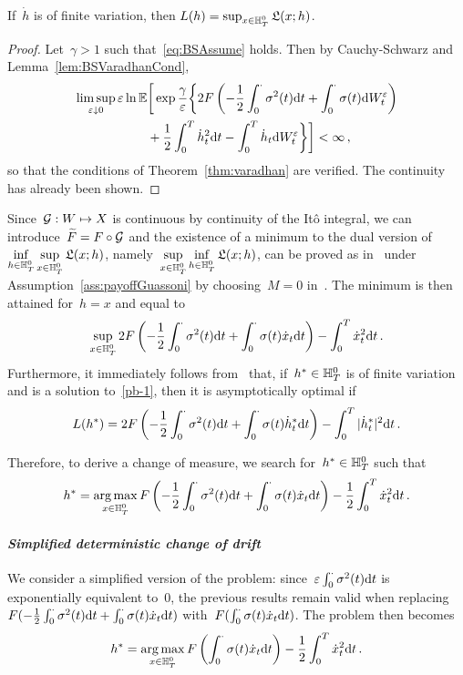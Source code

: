 \begin{lemma}
If~$\dot{h}$ is of finite variation, then 
$L(h) = \sup_{x \in \mathbb{H}_T^0}\mathfrak{L}(x;h)$.
\end{lemma}
\begin{proof}
Let~$\gamma>1$ such that~\eqref{eq:BSAssume} holds. Then by Cauchy-Schwarz and Lemma~\ref{lem:BSVaradhanCond},
\begin{align*}
\limsup\limits_{\varepsilon\downarrow 0} \varepsilon \ln\mathbb{E}&\bigg[\exp\frac{\gamma}{\varepsilon}\bigg\{2F\left(-\frac{1}{2}\int_0^\cdot \sigma^2(t)\mathrm{d} t + \int_0^\cdot \sigma(t) \mathrm{d} W_t^\varepsilon\right) \\
&+ \frac{1}{2}\int_0^T \dot{h}_t^2\mathrm{d} t - \int_0^T \dot{h}_t \mathrm{d} W_t^{\varepsilon} \bigg\}\bigg] <\infty\,,
\end{align*}
so that the conditions of Theorem~\ref{thm:varadhan} are verified.
The continuity has already been shown.
\end{proof}
Since~$\mathcal{G}: W\mapsto X$ is continuous by continuity of the It\^{o} integral, we can introduce~$\widetilde F =\nobreak F\circ\mathcal{G}$ and the existence of a minimum to the dual version of 
$\inf\limits_{h \in \mathbb{H}_T^0} \sup\limits_{x \in \mathbb{H}_T^0} \mathfrak{L}(x;h)$,
namely~$\sup\limits_{x \in \mathbb{H}_T^0} \inf\limits_{h \in \mathbb{H}_T^0}\mathfrak{L}(x;h)$,
can be proved as in~\cite{Guasoni2007OptimalTime} under Assumption~\ref{ass:payoffGuassoni} by choosing~$M=0$ in~\cite[Lemma~7.1]{Guasoni2007OptimalTime}. 
The minimum is then attained  for~$h=x$ and equal to 
\begin{equation}\label{pb-1}
    \sup\limits_{x \in \mathbb{H}_T^0}2F\left(-\frac{1}{2}\int_0^\cdot \sigma^2(t)\mathrm{d} t + \int_0^\cdot \sigma(t) \dot{x}_t \mathrm{d} t\right)
 - \int_0^T \dot{x}_t^2 \mathrm{d} t\,.
\end{equation}
Furthermore, it immediately follows from~\cite[Theorem~3.6]{Guasoni2007OptimalTime} that, if~$h^*\in \mathbb{H}_T^0$ is of finite variation and is a solution to~\eqref{pb-1}, then it is asymptotically optimal if
$$
L(h^{*}) = 2F\left(-\frac{1}{2}\int_0^\cdot \sigma^2(t)\mathrm{d} t + \int_0^\cdot \sigma(t) \dot{h}^{*}_t \mathrm{d} t\right) - \int_0^T |\dot{h}^{*}_t|^2 \mathrm{d} t\,.
$$

Therefore, to derive a change of measure, we search for~$h^{*} \in \mathbb{H}_T^0$ such that
$$
h^{*} = \operatorname*{arg\,max}\limits_{x \in \mathbb{H}_T^0}F\left(-\frac{1}{2}\int_0^\cdot \sigma^2(t)\mathrm{d} t + \int_0^\cdot \sigma(t) \dot{x}_t \mathrm{d} t\right)
 - \frac{1}{2}\int_0^T \dot{x}_t^2 \mathrm{d} t\,.
$$

\paragraph{\textit{Simplified deterministic change of drift}}
We consider a simplified version of the problem:
since~$\varepsilon\int_0^\cdot\sigma^2(t)\mathrm{d} t$ is exponentially equivalent to~$0$, the previous results remain valid 
when replacing~$F(-\frac{1}{2}\int_0^\cdot \sigma^2(t)\mathrm{d} t + \int_0^\cdot \sigma(t) \dot{x}_t \mathrm{d} t)$ with~$F(\int_0^\cdot \sigma(t) \dot{x}_t \mathrm{d} t)$. 
The problem then becomes
$$
h^{*} = \operatorname*{arg\,max}\limits_{x \in \mathbb{H}_T^0} F\left(\int_0^\cdot \sigma(t) \dot{x}_t \mathrm{d} t\right) - \frac{1}{2}\int_0^T \dot{x}_t^2 \mathrm{d} t\,.
$$

